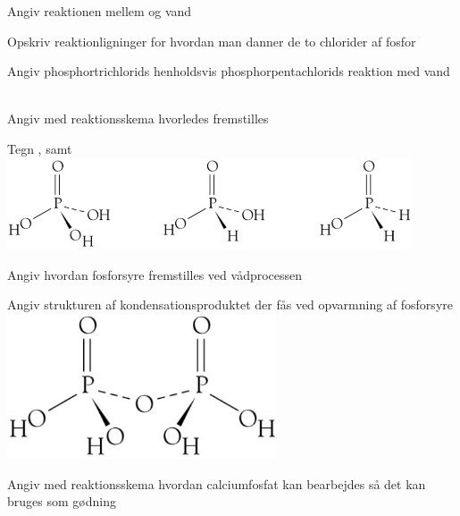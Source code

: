 \begin{flashcard}[Reaktion]{Angiv reaktionen mellem  og vand}
\end{flashcard}

\begin{flashcard}[Reaktion]{Opskriv reaktionligninger for hvordan man danner de to chlorider af fosfor}
\\ \vspace{7pt}
\end{flashcard}

\begin{flashcard}[Reaktion]{Angiv phosphortrichlorids henholdsvis phosphorpentachlorids reaktion med vand}
\\ \vspace{7pt}
\\
\end{flashcard}

\begin{flashcard}[Fremstilling]{Angiv med reaktionsskema hvorledes  fremstilles}
\end{flashcard}

\begin{flashcard}[Struktur]{Tegn ,  samt }
\includegraphics[width=0.9\textwidth]{figures/k15s395POxyAcids.png}
\end{flashcard}

\begin{flashcard}[Fremstilling]{Angiv hvordan fosforsyre fremstilles ved vådprocessen}
\end{flashcard}

\begin{flashcard}[Struktur]{Angiv strukturen af kondensationsproduktet der fås ved opvarmning af fosforsyre}
\includegraphics[width=0.6\textwidth]{figures/k15s396H4P2O7.png}
\end{flashcard}

\begin{flashcard}[Fremstilling]{Angiv med reaktionsskema hvordan calciumfosfat kan bearbejdes så det kan bruges som gødning}
\end{flashcard}